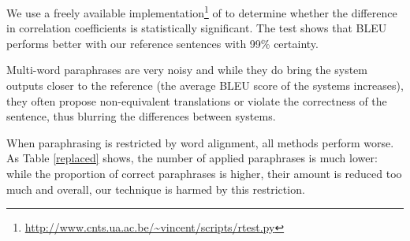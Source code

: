 \documentclass[11pt]{article}
\def\footurl#1{\footnote{\url{#1}}}
\begin{document}
We use a freely available implementation\footurl{http://www.cnts.ua.ac.be/~vincent/scripts/rtest.py} of  to determine whether the difference in correlation
coefficients is statistically significant. The test shows that BLEU performs
better with our reference sentences with 99\% certainty. 

Multi-word paraphrases are very noisy and while they do bring the system 
outputs closer to the reference (the average BLEU score of the systems 
increases), they often propose non-equivalent translations or violate the 
correctness of the sentence, thus blurring the differences between systems.

When paraphrasing is restricted by word alignment, all methods perform worse. 
As Table \ref{replaced} shows, the number of applied paraphrases is much lower: 
while the proportion of correct paraphrases is higher, their amount is reduced 
too much and overall, our technique is harmed by this restriction. 

\begin{table}[tb]
\begin{center}
\vspace{10pt}

\caption{Average number of replaced words/phrases.}
\label{replaced}
\end{center}
\end{table}
\end{document}
